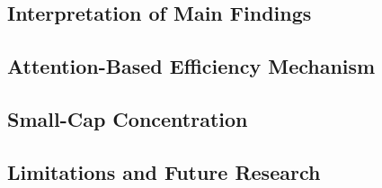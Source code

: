 
\subsection{Interpretation of Main Findings}

\subsection{Attention-Based Efficiency Mechanism}

\subsection{Small-Cap Concentration}

\subsection{Limitations and Future Research}

